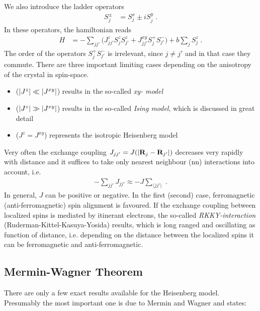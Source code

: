 %
We also introduce the ladder operators
%
\begin{align}\label{eq:}
S_{j}^{\pm} &= S_{j}^{x}\pm i S_{j}^{y}\;.
\end{align}
%
In these operators, the hamiltonian reads
\begin{align*}
H &= - \sum_{jj'} \bigg( J^{z}_{jj'} S_{j}^{z}  S_{j'}^{z}
+J_{jj'}^{xy}S_{j}^{+} S_{j'}^{-}
\bigg) + b \sum_{j} S^{z}_{j}\;.
\end{align*}
%
The order of the operators $S_{j}^{+}S_{j'}^{-}$ is irrelevant, since $j\ne j'$ and in that case they commute.
There are three important limiting cases depending on the anisotropy of the crystal in spin-space.
\begin{itemize}
	\item ($\abs{J^{z}}\ll\abs{J^{xy}}$) results in the so-called {\em xy- model}

\item ($\abs{J^{z}}\gg\abs{J^{xy}}$) results in the so-called {\em Ising model}, which is discussed in great detail 
\item ($J^{z} = J^{xy}$)  represents the isotropic Heisenberg model

%
\end{itemize}
%
Very often the exchange coupling $J_{jj'} = J(\abs{\mathbf R_{j}-\mathbf R_{j'}})$ decreases
very rapidly with distance and it suffices to take only nearest neighbour (nn) interactions into account, i.e.
%
\begin{align}\label{eq:}
-\sum_{jj'} J_{jj'} \approx -J \sum_{\langle jj' \rangle}\;.
\end{align}
%
In general, $J$ can be positive or negative. In the first (second) case,  ferromagnetic (anti-ferromagnetic) spin alignment is favoured. If the exchange coupling between localized spins
is mediated by itinerant electrons, the so-called {\em RKKY-interaction} (Ruderman-Kittel-Kasuya-Yosida) results, which is long ranged and oscillating as function of distance, i.e.
depending on the distance between the localized spins it can be ferromagnetic and anti-ferromagnetic.
\subsection{Mermin-Wagner Theorem}
%
There are only a few exact results available for the Heisenberg model. Presumably the most important one is due to Mermin and Wagner and states:

